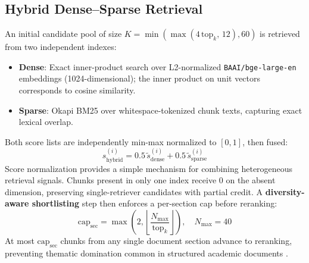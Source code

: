 \documentclass[conference]{IEEEtran}
\begin{document}
\subsection{Hybrid Dense--Sparse Retrieval}
An initial candidate pool of size
$K = \min\!\left(\max\!\left(4\,\mathrm{top}_k,\,12\right),60\right)$
is retrieved from two independent indexes:
\begin{itemize}
  \item \textbf{Dense}: Exact inner-product search over
        L2-normalized \texttt{BAAI/bge-large-en} embeddings
        (1024-dimensional); the inner product on unit vectors corresponds to cosine similarity.
  \item \textbf{Sparse}: Okapi BM25 \cite{robertson1995okapi}
        over whitespace-tokenized chunk texts, capturing exact lexical overlap.
\end{itemize}

Both score lists are independently min-max normalized to
$[0,1]$, then fused:
%
\begin{equation}
s_{\mathrm{hybrid}}^{(i)} =
  0.5\,\tilde{s}_{\mathrm{dense}}^{(i)} +
  0.5\,\tilde{s}_{\mathrm{sparse}}^{(i)}
\label{eq:hybrid}
\end{equation}
%
Score normalization provides a simple mechanism for combining heterogeneous retrieval signals. Chunks present in only one index receive $0$ on the absent
dimension, preserving single-retriever candidates with partial
credit. A \textbf{diversity-aware shortlisting} step then
enforces a per-section cap before reranking:
%
\begin{equation}
\mathrm{cap}_{\mathrm{sec}} =
  \max\!\left(2,\left\lfloor\frac{N_{\max}}{\mathrm{top}_k}
  \right\rfloor\right),\quad N_{\max}=40
\label{eq:cap}
\end{equation}
%
At most $\mathrm{cap}_{\mathrm{sec}}$ chunks from any single
document section advance to reranking, preventing thematic
domination common in structured academic documents
\cite{lo2020s2orc}.
\end{document}
